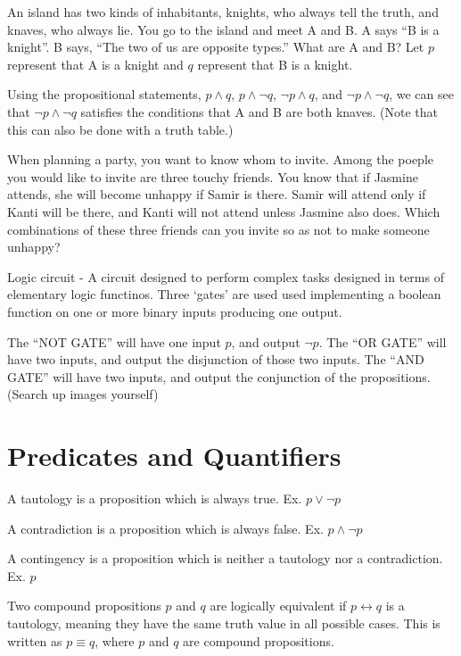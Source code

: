 \documentclass[../discrete.tex]{subfiles}
\begin{document}
\begin{example}
    An island has two kinds of inhabitants, knights, who always tell the truth, and knaves, who always lie. You go to the island and meet A and B. A says ``B is a knight''. B says, ``The two of us are opposite types.'' What are A and B? Let $p$ represent that A is a knight and $q$ represent that B is a knight.

    Using the propositional statements, $p\land q$, $p\land \neg q$, $\neg p \land q$, and $\neg p \land \neg q$, we can see that $\neg p \land \neg q$ satisfies the conditions that A and B are both knaves. (Note that this can also be done with a truth table.)
\end{example}

\ex When planning a party, you want to know whom to invite. Among the poeple you would like to invite are three touchy friends. You know that if Jasmine attends, she will become unhappy if Samir is there. Samir will attend only if Kanti will be there, and Kanti will not attend unless Jasmine also does. Which combinations of these three friends can you invite so as not to make someone unhappy?

Logic circuit - A circuit designed to perform complex tasks designed in terms of elementary logic functinos. Three `gates' are used used implementing a boolean function on one or more binary inputs producing one output.

The ``NOT GATE'' will have one input $p$, and output $\neg p$. The ``OR GATE'' will have two inputs, and output the disjunction of those two inputs. The ``AND GATE'' will have two inputs, and output the conjunction of the propositions. (Search up images yourself)

\section{Predicates and Quantifiers}
A tautology is a proposition which is always true. Ex. $p\lor \neg p$

A contradiction is a proposition which is always false. Ex. $p\land \neg p$

A contingency is a proposition which is neither a tautology nor a contradiction. Ex. $p$

Two compound propositions $p$ and $q$ are logically equivalent if $p\leftrightarrow q$ is a tautology, meaning they have the same truth value in all possible cases. This is written as $p\equiv q$, where $p$ and $q$ are compound propositions.
\end{document}
